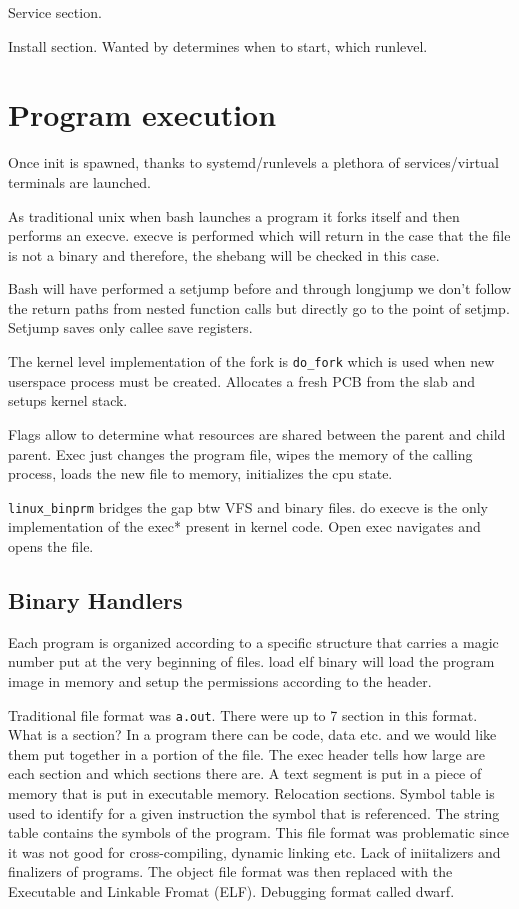 \documentclass[twoside]{article}
\begin{document}
Service section.

Install section. Wanted by determines when to start, which runlevel.

\section{Program execution}
\label{sec:Program execution}

Once init is spawned, thanks to systemd/runlevels a plethora of services/virtual
terminals are launched. 

As traditional unix when bash launches a program it forks itself and then
performs an execve. execve is performed which will return in the case that the
file is not a binary and therefore, the shebang will be checked in this case.

Bash will have performed a setjump before and through longjump we don't follow
the return paths from nested function calls but directly go to the point of
setjmp. Setjump saves only callee save registers.

The kernel level implementation of the fork is \texttt{do_fork} which is used
when new userspace process must be created. Allocates a fresh PCB from the slab
and setups kernel stack.

Flags allow to determine what resources are shared between the parent and child
parent. Exec just changes the program file, wipes the memory of the calling
process, loads the new file to memory, initializes the cpu state.

\texttt{linux_binprm} bridges the gap btw VFS and binary files. do execve is the
only implementation of the exec* present in kernel code. Open exec navigates and
opens the file.

\subsection{Binary Handlers}
\label{sec:Binary Handlers}

Each program is organized according to a specific structure that carries a magic
number put at the very beginning of files. load elf binary will load the program
image in memory and setup the permissions according to the header.

Traditional file format was \texttt{a.out}. There were up to 7 section in this
format. What is a section? In a program there can be code, data etc. and we
would like them put together in a portion of the file. The exec header tells how
large are each section and which sections there are. A text segment is put in a
piece of memory that is put in executable memory. Relocation sections. Symbol
table is used to identify for a given instruction the symbol that is referenced.
The string table contains the symbols of the program. This file format was
problematic since it was not good for cross-compiling, dynamic linking etc. Lack
of iniitalizers and finalizers of programs. The object file format was then
replaced with the Executable and Linkable Fromat (ELF). Debugging format called
dwarf.
\end{document}
